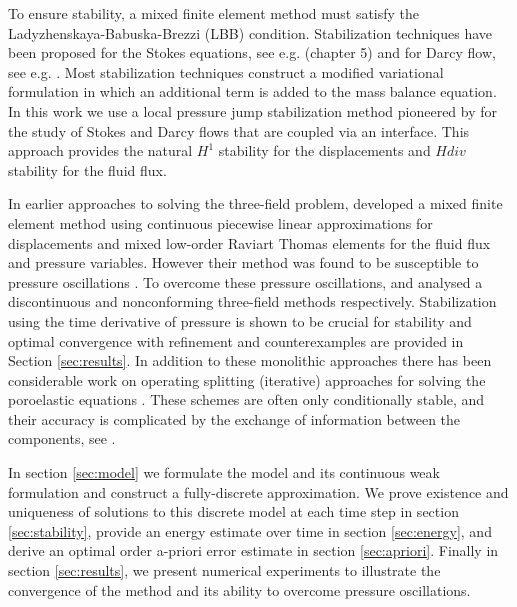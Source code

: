 To ensure stability, a mixed finite element method must satisfy the Ladyzhenskaya-Babuska-Brezzi (LBB) condition. Stabilization techniques have been proposed for the Stokes equations, see e.g. \cite{elman2005finite} (chapter 5) and for Darcy flow, see e.g. \cite{bochev2006computational}. Most stabilization techniques construct a modified variational formulation in which an additional term is added to the mass balance equation. In this work we use a local pressure jump stabilization method pioneered by \cite{burman2007unified} for the study of Stokes and Darcy flows that are coupled via an interface. This approach provides the natural $H^{1}$ stability for the displacements and $H{div}$ stability for the fluid flux. %

In earlier approaches to solving the three-field problem, \cite{phillips2007coupling,phillips2007couplingtwo} developed a mixed finite element method using continuous piecewise linear approximations for displacements and mixed low-order Raviart Thomas elements for the fluid flux and pressure variables. However their method was found to be susceptible to pressure oscillations \cite{phillips2009overcoming}. To overcome these pressure oscillations, \cite{li2012discontinuous} and \cite{yi2013coupling} analysed a discontinuous and nonconforming three-field methods respectively. Stabilization using the time derivative of pressure is shown to be crucial for stability and optimal convergence with refinement and counterexamples are provided in Section \ref{sec:results}.
In addition to these monolithic approaches there has been considerable work on operating splitting (iterative) approaches for solving the poroelastic equations \cite{wheeler2007iteratively,feng2010fully,kim2011stability}. These schemes are often only conditionally stable, and their accuracy is complicated by the exchange of information between the components, see \cite{carey2013aposteriori}.


In section \ref{sec:model} we formulate the model and its continuous weak formulation and construct a fully-discrete approximation. We prove existence and uniqueness of solutions to this discrete model at each time step in section \ref{sec:stability}, provide an energy estimate over time in section \ref{sec:energy}, and derive an optimal order a-priori error estimate in section \ref{sec:apriori}. Finally in section \ref{sec:results}, we present numerical experiments to illustrate the convergence of the method and its ability to overcome pressure oscillations.
